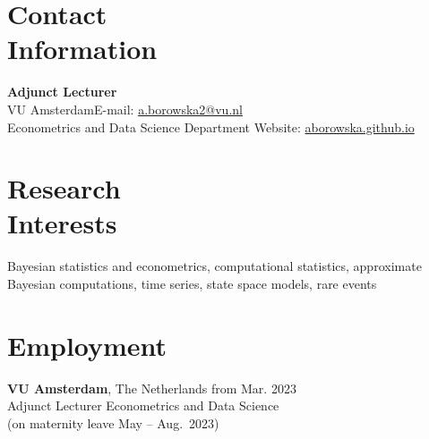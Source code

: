 \documentclass[margin,line]{resume}
\begin{document}
\begin{resume}
    \section{\mysidestyle Contact\\Information}
    \textbf{Adjunct Lecturer} \\
    VU Amsterdam\hfill  E-mail: \url{a.borowska2@vu.nl} \\
    Econometrics and Data Science Department \hfill Website: \url{aborowska.github.io}\vspace{-5mm}\\ %
    
    \section{\mysidestyle Research\\Interests}
    
    Bayesian statistics and econometrics, computational statistics, approximate Bayesian computations, time series, state space models, rare events
\vspace{-1mm}   
 
    \section{\mysidestyle Employment }
    \textbf{VU Amsterdam},  The Netherlands \hfill from Mar. 2023\\
	Adjunct Lecturer Econometrics and Data Science\\
    (on maternity leave May -- Aug.\ 2023)
	

\end{resume}
\end{document}
